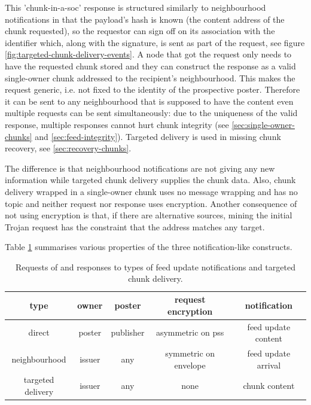 This 'chunk-in-a-soc' response is structured similarly to neighbourhood notifications in that the payload's hash is known (the content address of the chunk requested), so the requestor can  sign off on its association with the identifier which, along with the signature, is sent as part of the request, see figure \ref{fig:targeted-chunk-delivery-events}. A node that got the request only needs to have the requested chunk stored and they can construct the response as a valid single-owner chunk addressed to the recipient's neighbourhood.
This makes the request generic, i.e. not fixed to   the identity of the prospective poster. Therefore it can be sent to any neighbourhood that is supposed to have the content even multiple requests can be sent simultaneously: due to the uniqueness of the valid response, multiple responses cannot hurt chunk integrity (see \ref{sec:single-owner-chunks} and \ref{sec:feed-integrity}). Targeted delivery is used in missing chunk recovery, see \ref{sec:recovery-chunks}.

The difference is that neighbourhood notifications are not giving any new information while targeted chunk delivery supplies the chunk data. Also, chunk delivery wrapped in a single-owner chunk uses no message wrapping and has no topic and neither request nor response uses encryption.
Another consequence of not using encryption is that, if there are alternative sources, mining the initial Trojan request has the constraint that the address matches any target. 

Table \ref{tab:notifications} summarises various properties of the three notification-like constructs.

\begin{table}[htpb]
    \centering
    \begin{tabular}{c|c|c|c|c|}
    type & owner & poster & request encryption & notification  \\\hline
         direct & poster & publisher & asymmetric on pss & feed update  content\\
         neighbourhood & issuer & any & symmetric on envelope & feed update arrival\\
         targeted delivery & issuer & any & none & chunk content\\
    \end{tabular}
    \caption[Feed update notifications]{Requests of and responses to types of feed update notifications and targeted chunk delivery.}
    \label{tab:notifications}
\end{table}


